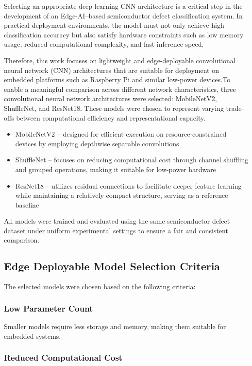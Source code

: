 Selecting an appropriate deep learning CNN architecture is a critical step in the development of an Edge-AI–based semiconductor defect classification system. In practical deployment environments, the model must not only achieve high classification accuracy but also satisfy hardware constraints such as low memory usage, reduced computational complexity, and fast inference speed.

Therefore, this work focuses on lightweight and edge-deployable convolutional neural network (CNN) architectures that are suitable for deployment on embedded platforms such as Raspberry Pi and similar low-power devices.To enable a meaningful comparison across different network characteristics, three convolutional neural network architectures were selected: MobileNetV2, ShuffleNet, and ResNet18. These models were chosen to represent varying trade-offs between computational efficiency and representational capacity.

\begin{itemize}
\item MobileNetV2 – designed for efficient execution on resource-constrained devices by employing depthwise separable convolutions
\item ShuffleNet – focuses on reducing computational cost through channel shuffling and grouped operations, making it suitable for low-power hardware
\item ResNet18 – utilizes residual connections to facilitate deeper feature learning while maintaining a relatively compact structure, serving as a reference baseline
\end{itemize}

All models were trained and evaluated using the same semiconductor defect dataset under uniform experimental settings to ensure a fair and consistent comparison.

\subsection{Edge Deployable Model Selection Criteria}
The selected models were chosen based on the following criteria:

\subsubsection{Low Parameter Count}

Smaller models require less storage and memory, making them suitable for embedded systems.

\subsubsection{Reduced Computational Cost}

